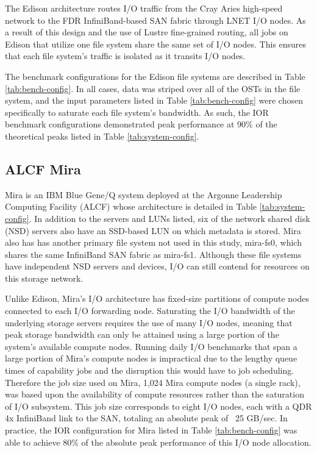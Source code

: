 The Edison architecture routes I/O traffic from the Cray Aries high-speed network to the FDR InfiniBand-based SAN fabric through LNET I/O nodes.
As a result of this design and the use of Lustre fine-grained routing, all jobs on Edison that utilize one file system share the same set of I/O nodes.
This ensures that each file system's traffic is isolated as it transits I/O nodes.

The benchmark configurations for the Edison file systems are described in Table \ref{tab:bench-config}.
In all cases, data was striped over all of the OSTs in the file system, and the input parameters listed in Table \ref{tab:bench-config} were chosen specifically to saturate each file system's bandwidth.
As such, the IOR benchmark configurations demonstrated peak performance at 90\% of the theoretical peaks listed in Table \ref{tab:system-config}.

\subsection{ALCF Mira} \label{sec:platforms/mira}

Mira is an IBM Blue Gene/Q system deployed at the Argonne Leadership Computing Facility (ALCF) whose architecture is detailed in Table \ref{tab:system-config}.
In addition to the servers and LUNs listed, six of the network shared disk (NSD) servers also have an SSD-based LUN on which metadata is stored.
Mira also has has another primary file system not used in this study, mira-fs0, which shares the same InfiniBand SAN fabric as mira-fs1.
Although these file systems have independent NSD servers and devices, I/O can still contend for resources on this storage network.

Unlike Edison, Mira's I/O architecture has fixed-size partitions of compute nodes connected to each I/O forwarding node.
Saturating the I/O bandwidth of the underlying storage servers requires the use of many I/O nodes, meaning that peak storage bandwidth can only be attained using a large portion of the system's available compute nodes.
Running daily I/O benchmarks that span a large portion of Mira's compute nodes is impractical due to the lengthy queue times of capability jobs and the disruption this would have to job scheduling.
Therefore the job size used on Mira, 1,024 Mira compute nodes (a single rack), was based upon the availability of compute resources rather than the saturation of I/O subsystem.
This job size corresponds to eight I/O nodes, each with a QDR 4x InfiniBand link to the SAN, totaling an absolute peak of ~25 GB/sec.
In practice, the IOR configuration for Mira listed in Table \ref{tab:bench-config} was able to achieve 80\% of the absolute peak performance of this I/O node allocation.
